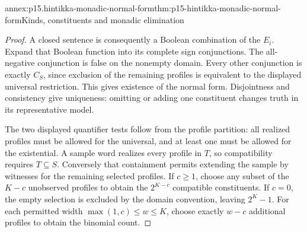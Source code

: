 \begin{annexitem}{annex:p15.hintikka-monadic-normal-form}{thm:p15-hintikka-monadic-normal-form}{Kinds, constituents and monadic elimination}
\begin{proof}
A closed sentence is consequently a Boolean combination of the \(E_i\).
Expand that Boolean function into its complete sign conjunctions. The
all-negative conjunction is false on the nonempty domain. Every other
conjunction is exactly \(C_S\), since exclusion of the remaining
profiles is equivalent to the displayed universal restriction. This
gives existence of the normal form. Disjointness and consistency give
uniqueness: omitting or adding one constituent changes truth in its
representative model.

The two displayed quantifier tests follow from the profile partition:
all realized profiles must be allowed for the universal, and at least
one must be allowed for the existential. A sample word realizes every
profile in \(T\), so compatibility requires \(T\subseteq S\).
Conversely that containment permits extending the sample by witnesses
for the remaining selected profiles. If \(c\geq1\), choose any
subset of the \(K-c\) unobserved profiles to obtain the \(2^{K-c}\)
compatible constituents. If \(c=0\), the empty selection is excluded
by the domain convention, leaving \(2^K-1\). For each permitted width
\(\max(1,c)\leq w\leq K\), choose exactly \(w-c\) additional profiles
to obtain the binomial count.
\end{proof}
\end{annexitem}

